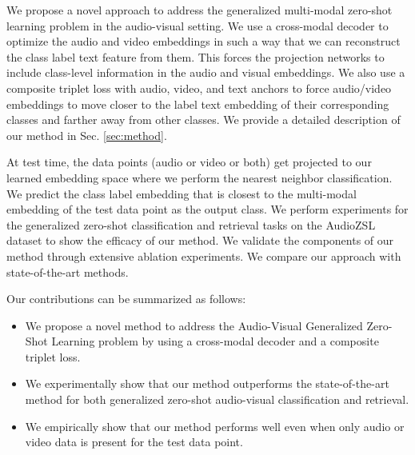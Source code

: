 \documentclass[10pt,twocolumn,letterpaper]{article}
\begin{document}
We propose a novel approach to address the generalized multi-modal zero-shot learning problem in the audio-visual setting. We use a cross-modal decoder to optimize the audio and video embeddings in such a way that we can reconstruct the class label text feature from them. This forces the projection networks to include class-level information in the audio and visual embeddings. We also use a composite triplet loss with audio, video, and text anchors to force audio/video embeddings to move closer to the label text embedding of their corresponding classes and farther away from other classes. We provide a detailed description of our method in Sec. \ref{sec:method}.


At test time, the data points (audio or video or both) get projected to our learned embedding space where we perform the nearest neighbor classification. We predict the class label embedding that is closest to the multi-modal embedding of the test data point as the output class. We perform experiments for the generalized zero-shot classification and retrieval tasks on the AudioZSL~\cite{parida2020coordinated} dataset to show the efficacy of our method. We validate the components of our method through extensive ablation experiments. We compare our approach with state-of-the-art methods.

Our contributions can be summarized as follows:

\begin{itemize}
    \item We propose a novel method to address the Audio-Visual Generalized Zero-Shot Learning problem by using a cross-modal decoder and a composite triplet loss.
    \item We experimentally show that our method outperforms the state-of-the-art method for both generalized zero-shot audio-visual classification and retrieval.
    \item We empirically show that our method performs well even when only audio or video data is present for the test data point.
\end{itemize}
\end{document}
